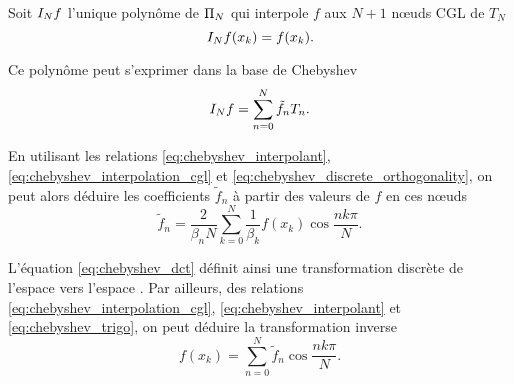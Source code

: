 \par


Soit $\interpolant{f}{N}$ l'unique polynôme de $\polyspace{N}$ qui interpole $f$ aux $N+1$ n\oe uds CGL de $T_N$
\begin{equation}
	\interpolant{f}{N}(x_k) = f(x_k).
	\label{eq:chebyshev_interpolation_cgl}
\end{equation}

Ce polynôme peut s'exprimer dans la base de Chebyshev
\begin{equation}
	\interpolant{f}{N} = \sum_{n=0}^{N} \tilde{f}_n T_n.
	\label{eq:chebyshev_interpolant}
\end{equation}

En utilisant les relations \eqref{eq:chebyshev_interpolant}, \eqref{eq:chebyshev_interpolation_cgl} et \eqref{eq:chebyshev_discrete_orthogonality}, on peut alors déduire les coefficients $\tilde{f}_n$ à partir des valeurs de $f$ en ces n\oe uds%
\begin{equation}
	\tilde{f}_n = \frac{2}{\beta_n N} \sum_{k=0}^{N} \frac{1}{\beta_k} f(x_k) \cos \frac{n k \pi}{N}.
	\label{eq:chebyshev_dct}
\end{equation}

L'équation \eqref{eq:chebyshev_dct} définit ainsi une transformation discrète de l'espace  vers l'espace . 
Par ailleurs, des relations \eqref{eq:chebyshev_interpolation_cgl}, \eqref{eq:chebyshev_interpolant} et \eqref{eq:chebyshev_trigo}, on peut déduire la transformation inverse
\begin{equation}
	f(x_k) = \sum_{n=0}^{N} \tilde{f}_n \cos \frac{n k \pi}{N}.
	\label{eq:chebyshev_idct}
\end{equation}

